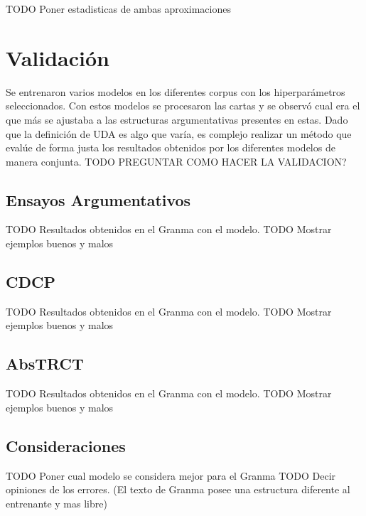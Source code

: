 TODO Poner estadisticas de ambas aproximaciones

\section{Validación}

Se entrenaron varios modelos en los diferentes corpus con los hiperparámetros seleccionados. Con estos modelos 
se procesaron las cartas y se observó cual era el que más se ajustaba a las estructuras argumentativas presentes 
en estas. Dado que la definición de UDA es algo que varía, es complejo realizar un método que evalúe de forma 
justa los resultados obtenidos por los diferentes modelos de manera conjunta. TODO PREGUNTAR COMO HACER LA VALIDACION?

\subsection{Ensayos Argumentativos}

TODO Resultados obtenidos en el Granma con el modelo.
TODO Mostrar ejemplos buenos y malos

\subsection{CDCP}

TODO Resultados obtenidos en el Granma con el modelo.
TODO Mostrar ejemplos buenos y malos

\subsection{AbsTRCT}

TODO Resultados obtenidos en el Granma con el modelo.
TODO Mostrar ejemplos buenos y malos

\subsection{Consideraciones}

TODO Poner cual modelo se considera mejor para el Granma 
TODO Decir opiniones de los errores. (El texto de Granma posee una estructura diferente al entrenante y mas libre)
